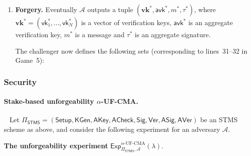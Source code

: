 \documentclass{article}
\newcommand{\vk}[0]{\mathsf{vk}}
\begin{document}
\begin{enumerate}
        The above interaction may continue for an arbitrary
        (polynomially bounded) number of queries.

  \item \textbf{Forgery.}
        Eventually $\mathcal{A}$ outputs a tuple
        $(\mathbf{vk}^\ast,\mathsf{avk}^\ast,m^\ast,\tau^\ast)$, where
        $\mathbf{vk}^\ast = (\vk^\ast_1,\dots,\vk^\ast_N)$ is a vector of
        verification keys, $\mathsf{avk}^\ast$ is an aggregate verification
        key, $m^\ast$ is a message and $\tau^\ast$ is an aggregate signature.

        The challenger now defines the following sets (corresponding to
        lines~31–32 in Game~5):

      \end{enumerate}

\subsubsection{Security}
\paragraph{Stake-based unforgeability $\alpha$-\textsf{UF-CMA}.} \ 
\newline
Let $\Pi_{\mathsf{STMS}}
  =
  (\mathsf{Setup}, \mathsf{KGen}, \mathsf{AKey}, \mathsf{ACheck},
   \mathsf{Sig}, \mathsf{Ver}, \mathsf{ASig}, \mathsf{AVer})$ be an STMS scheme as above, and consider the following experiment for an adversary $\mathcal{A}$.
   
\textbf{The unforgeability experiment} $\mathsf{Exp}^{\alpha\text{-UF-CMA}}_{\Pi_{\mathsf{STMS}},\mathcal{A}}(\lambda)$.
\end{document}
